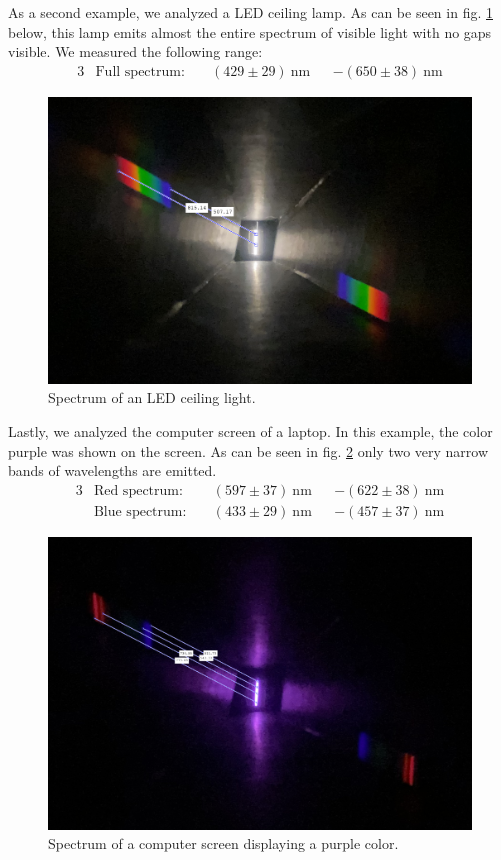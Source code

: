 As a second example, we analyzed a LED ceiling lamp. As can be seen in fig. \ref{fig_lamp2} below, this lamp
emits almost the entire spectrum of visible light with no gaps visible. We measured the following range:
\begin{alignat}{3}
    &\text{Full spectrum:} \; &&(429 \pm 29)~\si{\nano\meter} & &- (650 \pm 38)~\si{\nano\meter} \nonumber
\end{alignat}
\begin{figure}[H]
    \centering
    \includegraphics[scale = 0.41]{src/images/lamp2_meas.png}
    \caption{Spectrum of an LED ceiling light.}
    \label{fig_lamp2}
\end{figure}

Lastly, we analyzed the computer screen of a laptop. In this example, the color purple was shown on the screen.
As can be seen in fig. \ref{fig_purple_screen} only two very narrow bands of wavelengths are emitted.
\begin{alignat}{3}
    &\text{Red spectrum:} \; &&(597 \pm 37)~\si{\nano\meter} & &- (622 \pm 38)~\si{\nano\meter} \nonumber\\
    &\text{Blue spectrum:} \; &&(433 \pm 29)~\si{\nano\meter} & &- (457 \pm 37)~\si{\nano\meter} \nonumber
\end{alignat}
\begin{figure}[H]
    \centering
    \includegraphics[scale = 0.25]{src/images/purple_screen_meas.png}
    \caption{Spectrum of a computer screen displaying a purple color.}
    \label{fig_purple_screen}
\end{figure}

